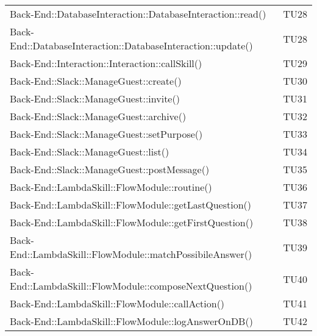 \documentclass[../PianoDiQualifica.tex]{subfiles}
\begin{document}
\begin{longtable}[c] {>{\centering\arraybackslash}p{9cm} >{\centering\arraybackslash}p{3cm}}
 			\addlinespace[0.3em]
			\midrule
			\addlinespace[0.3em] 
 			Back-End::DatabaseInteraction::DatabaseInteraction::read()& TU28 \\ 
 			\addlinespace[0.3em]
			\midrule
			\addlinespace[0.3em]
 			Back-End::DatabaseInteraction::DatabaseInteraction::update()& TU28 \\ 		
 			\addlinespace[0.3em]
			\midrule
			\addlinespace[0.3em]
			Back-End::Interaction::Interaction::callSkill()& TU29 \\ 
 			\addlinespace[0.3em]
			\midrule
			\addlinespace[0.3em]
 			Back-End::Slack::ManageGuest::create()& TU30 \\
 			\addlinespace[0.3em]
			\midrule
			\addlinespace[0.3em]
 			Back-End::Slack::ManageGuest::invite()& TU31 \\ 
 			\addlinespace[0.3em]
			\midrule
			\addlinespace[0.3em]
 			Back-End::Slack::ManageGuest::archive()& TU32 \\
 			\addlinespace[0.3em]
			\midrule
			\addlinespace[0.3em]
 			Back-End::Slack::ManageGuest::setPurpose()& TU33 \\ 
 			\addlinespace[0.3em]
			\midrule
			\addlinespace[0.3em]
			Back-End::Slack::ManageGuest::list()& TU34 \\ 
 			\addlinespace[0.3em]
			\midrule
			\addlinespace[0.3em]
 			Back-End::Slack::ManageGuest::postMessage()& TU35 \\ 
 			\addlinespace[0.3em]
			\midrule
			\addlinespace[0.3em]
 			Back-End::LambdaSkill::FlowModule::routine()& TU36 \\ 
			\addlinespace[0.3em]
			\midrule
			\addlinespace[0.3em]
 			Back-End::LambdaSkill::FlowModule::getLastQuestion()& TU37 \\ 
 			\addlinespace[0.3em]
			\midrule
			\addlinespace[0.3em]
 			Back-End::LambdaSkill::FlowModule::getFirstQuestion()& TU38 \\ 
 			\addlinespace[0.3em]
			\midrule
			\addlinespace[0.3em]
 			Back-End::LambdaSkill::FlowModule::matchPossibileAnswer()& TU39 \\ 
			\addlinespace[0.3em]
			\midrule
			\addlinespace[0.3em]
 			Back-End::LambdaSkill::FlowModule::composeNextQuestion()& TU40 \\ 
 			\addlinespace[0.3em]
			\midrule
			\addlinespace[0.3em]
			Back-End::LambdaSkill::FlowModule::callAction()& TU41 \\ 
 			\addlinespace[0.3em]
			\midrule
			\addlinespace[0.3em]
			Back-End::LambdaSkill::FlowModule::logAnswerOnDB()& TU42 \\ 

\end{longtable}
\end{document}
